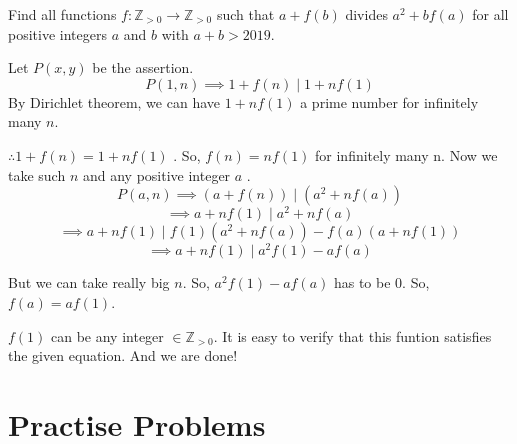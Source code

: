 \begin{example}[IMO SL 2019/N4]
Find all functions $f:\mathbb Z_{>0}\to \mathbb Z_{>0}$ such that $a+f(b)$ divides $a^2+bf(a)$ for all positive integers $a$ and $b$ with $a+b>2019$.
\end{example}


\begin{soln}
Let $P(x,y)$ be the assertion.
\[P(1, n) \implies 1 + f(n) \mid 1 + nf(1)  \]
By Dirichlet theorem, we can have $1 + nf(1)$ a prime number for infinitely many $n$.

$\therefore 1 + f(n) = 1 + nf(1) $ . So, $f(n) = nf(1)$ for infinitely many n.
Now we take such $n$ and any positive integer $a$ .
\[P(a,n) \implies (a+ f(n)) \mid  (a^2 + nf(a))\]
\[ \implies a+ nf(1) \mid  a^2 + nf(a )\]
\[ \implies a+ nf(1)\mid f(1)(a^2 + nf(a )) - f(a)(a+ nf(1))\]
\[ \implies a+ nf(1)\mid  a^2f(1) -a f(a )\]

But we can take really big $n$. So, $a^2f(1) -a f(a)$ has to be $0$. So,  $f(a) = af(1)  $. 

$f(1) $ can be any integer $\in \mathbb Z_{>0}$. It is easy to verify that this funtion satisfies the given equation. And we are done!

\end{soln}














\section{Practise Problems}

























